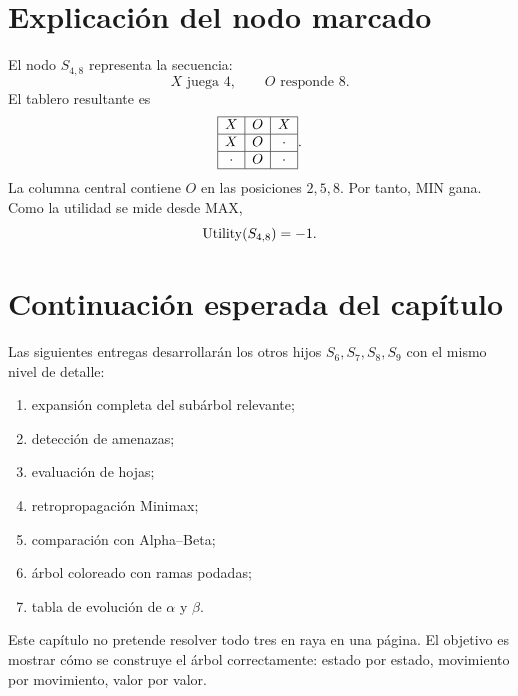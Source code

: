 \section{Explicación del nodo marcado}

El nodo $S_{4,8}$ representa la secuencia:
\[
X\text{ juega }4,\qquad O\text{ responde }8.
\]
El tablero resultante es
\[
\begin{array}{|c|c|c|}\hline X & O & X \\ \hline X & O & \cdot \\ \hline \cdot & O & \cdot \\ \hline \end{array}.
\]
La columna central contiene $O$ en las posiciones $2,5,8$. Por tanto, MIN gana. Como la utilidad se mide desde MAX,
\[
\operatorname{Utility}(S_{4,8})=-1.
\]

\section{Continuación esperada del capítulo}

Las siguientes entregas desarrollarán los otros hijos $S_6,S_7,S_8,S_9$ con el mismo nivel de detalle:

\begin{enumerate}
\item expansión completa del subárbol relevante;
\item detección de amenazas;
\item evaluación de hojas;
\item retropropagación Minimax;
\item comparación con Alpha--Beta;
\item árbol coloreado con ramas podadas;
\item tabla de evolución de $\alpha$ y $\beta$.
\end{enumerate}

\begin{summarybox}
Este capítulo no pretende resolver todo tres en raya en una página. El objetivo es mostrar cómo se construye el árbol correctamente: estado por estado, movimiento por movimiento, valor por valor.
\end{summarybox}
